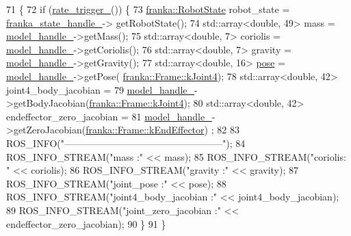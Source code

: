 \begin{DoxyCode}
71                                                                           \{
72   \textcolor{keywordflow}{if} (\hyperlink{classfranka__example__controllers_1_1ModelExampleController_aff2c4d48db198405dd9f4366cdedb82f}{rate\_trigger\_}()) \{
73     \hyperlink{structfranka_1_1RobotState}{franka::RobotState} robot\_state = \hyperlink{classfranka__example__controllers_1_1ModelExampleController_a6619cd4e5d970fde0779dfa8d5da2b71}{franka\_state\_handle\_}->
      getRobotState();
74     std::array<double, 49> mass = \hyperlink{classfranka__example__controllers_1_1ModelExampleController_a6eb1270e267595e0e281ee765f0ec550}{model\_handle\_}->getMass();
75     std::array<double, 7> coriolis = \hyperlink{classfranka__example__controllers_1_1ModelExampleController_a6eb1270e267595e0e281ee765f0ec550}{model\_handle\_}->getCoriolis();
76     std::array<double, 7> gravity = \hyperlink{classfranka__example__controllers_1_1ModelExampleController_a6eb1270e267595e0e281ee765f0ec550}{model\_handle\_}->getGravity();
77     std::array<double, 16> \hyperlink{namespaceinteractive__marker_a06e4691dc5f93e0da6dc9a6efa8d99b5}{pose} = \hyperlink{classfranka__example__controllers_1_1ModelExampleController_a6eb1270e267595e0e281ee765f0ec550}{model\_handle\_}->getPose(
      \hyperlink{namespacefranka_a00b729ddce916481d3f0d10febec4f5baee68341b1d0398c4cf2b5fc46bf23936}{franka::Frame::kJoint4});
78     std::array<double, 42> joint4\_body\_jacobian =
79         \hyperlink{classfranka__example__controllers_1_1ModelExampleController_a6eb1270e267595e0e281ee765f0ec550}{model\_handle\_}->getBodyJacobian(\hyperlink{namespacefranka_a00b729ddce916481d3f0d10febec4f5baee68341b1d0398c4cf2b5fc46bf23936}{franka::Frame::kJoint4});
80     std::array<double, 42> endeffector\_zero\_jacobian =
81         \hyperlink{classfranka__example__controllers_1_1ModelExampleController_a6eb1270e267595e0e281ee765f0ec550}{model\_handle\_}->getZeroJacobian(\hyperlink{namespacefranka_a00b729ddce916481d3f0d10febec4f5ba3617dcc7555dbca3c3e86e7535914fdf}{franka::Frame::kEndEffector})
      ;
82 
83     ROS\_INFO(\textcolor{stringliteral}{"--------------------------------------------------"});
84     ROS\_INFO\_STREAM(\textcolor{stringliteral}{"mass :"} << mass);
85     ROS\_INFO\_STREAM(\textcolor{stringliteral}{"coriolis: "} << coriolis);
86     ROS\_INFO\_STREAM(\textcolor{stringliteral}{"gravity :"} << gravity);
87     ROS\_INFO\_STREAM(\textcolor{stringliteral}{"joint\_pose :"} << pose);
88     ROS\_INFO\_STREAM(\textcolor{stringliteral}{"joint4\_body\_jacobian :"} << joint4\_body\_jacobian);
89     ROS\_INFO\_STREAM(\textcolor{stringliteral}{"joint\_zero\_jacobian :"} << endeffector\_zero\_jacobian);
90   \}
91 \}
\end{DoxyCode}
